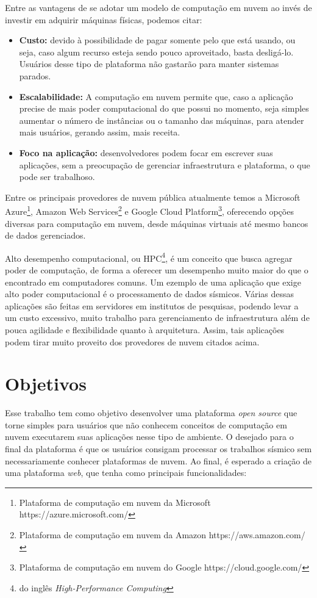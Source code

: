 \documentclass[11pt,twoside]{article}
\begin{document}
Entre as vantagens de se adotar um modelo de computação em nuvem ao invés de investir em adquirir máquinas físicas, podemos citar:

\begin{itemize}
  \item \textbf{Custo:} devido à possibilidade de pagar somente pelo que está usando, ou seja, caso algum recurso esteja sendo pouco aproveitado, basta desligá-lo. Usuários desse tipo de 
  plataforma não gastarão para manter sistemas parados.
  \item \textbf{Escalabilidade:} A computação em nuvem permite que, caso a aplicação precise de mais poder computacional do que possui no momento, seja simples aumentar
  o número de instâncias ou o tamanho das máquinas, para atender mais usuários, gerando assim, mais receita.
  \item \textbf{Foco na aplicação:} desenvolvedores podem focar em escrever suas 
  aplicações, sem a preocupação de gerenciar infraestrutura e plataforma, o que pode ser trabalhoso.

\end{itemize}

Entre os principais provedores de nuvem pública atualmente temos a Microsoft Azure\footnote{Plataforma de computação em nuvem da Microsoft https://azure.microsoft.com/}, 
Amazon Web Services\footnote{Plataforma de computação em nuvem da Amazon https://aws.amazon.com/} e Google Cloud Platform\footnote{Plataforma de computação em nuvem do Google https://cloud.google.com/}, 
oferecendo opções diversas para computação em nuvem, desde máquinas virtuais até mesmo bancos de dados gerenciados.

Alto desempenho computacional, ou HPC\footnote{do inglês \emph{High-Performance Computing}}, é um conceito que busca agregar poder de computação, de forma a oferecer um desempenho
muito maior do que o encontrado em computadores comuns. Um ezemplo de uma aplicação que exige alto poder computacional é o processamento de dados sísmicos.
Várias dessas aplicações são feitas em servidores em institutos de pesquisas, podendo levar
a um custo excessivo, muito trabalho para gerenciamento de infraestrutura além de pouca agilidade e flexibilidade quanto à arquitetura. Assim, tais aplicações podem 
tirar muito proveito dos provedores de nuvem citados acima.

\section{Objetivos}
Esse trabalho tem como objetivo desenvolver uma plataforma \emph{open source} que torne simples para usuários que não conhecem conceitos de computação em nuvem 
executarem suas aplicações nesse tipo de ambiente. 
O desejado para o final da plataforma é que os usuários consigam processar 
os trabalhos sísmico sem necessariamente conhecer plataformas de nuvem.  
Ao final, é esperado a criação de uma plataforma \emph{web}, que tenha como principais funcionalidades:
\end{document}
